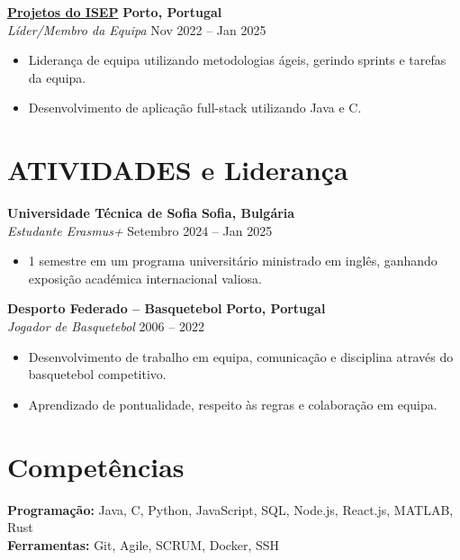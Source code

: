 \documentclass[10pt, letterpaper]{article}
\newenvironment{highlights}{
    \begin{itemize}[
        topsep=0.10 cm,
        parsep=0.10 cm,
        partopsep=0pt,
        itemsep=0pt,
        leftmargin=1cm %
    ]
}{
    \end{itemize}
}
\begin{document}
\textbf{\href{https://purenimble.github.io/projects}{Projetos do ISEP}} \hfill \textbf{Porto, Portugal} \\
\textit{Líder/Membro da Equipa} \hfill Nov 2022 – Jan 2025 \\
\begin{highlights}
    \item Liderança de equipa utilizando metodologias ágeis, gerindo sprints e tarefas da equipa.
    \item Desenvolvimento de aplicação full-stack utilizando Java e C.
\end{highlights}

\section{ATIVIDADES e Liderança}
\textbf{Universidade Técnica de Sofia} \hfill \textbf{Sofia, Bulgária} \\
\textit{Estudante Erasmus+} \hfill Setembro 2024 – Jan 2025 \\
\begin{highlights}
    \item 1 semestre em um programa universitário ministrado em inglês, ganhando exposição académica internacional valiosa.
\end{highlights}

\textbf{Desporto Federado – Basquetebol} \hfill \textbf{Porto, Portugal} \\
\textit{Jogador de Basquetebol} \hfill 2006 – 2022 \\
\begin{highlights}
    \item Desenvolvimento de trabalho em equipa, comunicação e disciplina através do basquetebol competitivo.
    \item Aprendizado de pontualidade, respeito às regras e colaboração em equipa.
\end{highlights}

\section{Competências}
\textbf{Programação:} Java, C, Python, JavaScript, SQL, Node.js, React.js, MATLAB, Rust \\
\textbf{Ferramentas:} Git, Agile, SCRUM, Docker, SSH
\end{document}
